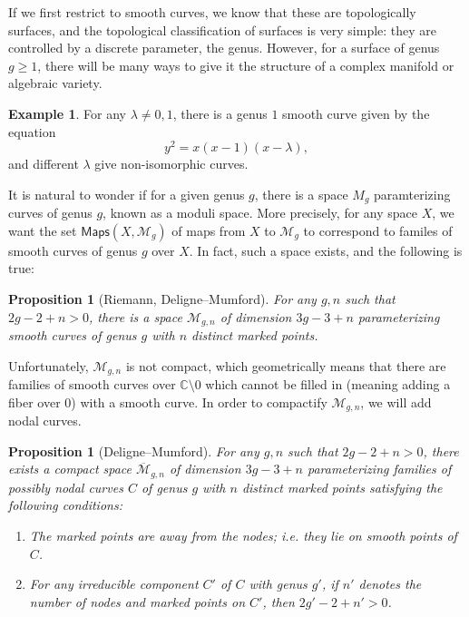 \documentclass{amsart}
\newtheorem{prop}[thm]{Proposition}
\theoremstyle{definition}
\newtheorem{exm}[thm]{Example}
\theoremstyle{remark}
\theoremstyle{plain}
\theoremstyle{definition}
\theoremstyle{remark}
\newcommand{\C}{\mathbb{C}}
\newcommand{\Mbar}{\overline{\mathcal{M}}}
\newcommand{\mc}[1]{\mathcal{#1}}
\newcommand{\ms}[1]{\mathsf{#1}}
\newcommand{\1}{\mathbf{1}}
\newcommand{\2}{\mathbf{2}}
\newcommand{\3}{\mathbf{3}}
\begin{document}
If we first restrict to smooth curves, we know that these are topologically surfaces, and the topological classification of surfaces is very simple: they are controlled by a discrete parameter, the genus. However, for a surface of genus $g \geq 1$, there will be many ways to give it the structure of a complex manifold or algebraic variety.

\begin{exm}
    For any $\lambda \neq 0,1$, there is a genus $1$ smooth curve given by the equation
    \[ y^2=x(x-1)(x-\lambda), \]
    and different $\lambda$ give non-isomorphic curves.
\end{exm}

It is natural to wonder if for a given genus $g$, there is a space $M_g$ paramterizing curves of genus $g$, known as a moduli space. More precisely, for any space $X$, we want the set $\ms{Maps}(X, \mc{M}_g)$ of maps from $X$ to $\mc{M}_g$ to correspond to familes of smooth curves of genus $g$ over $X$. In fact, such a space exists, and the following is true:

\begin{prop}[Riemann, Deligne--Mumford]
    For any $g, n$ such that $2g-2+n > 0$, there is a space $\mc{M}_{g,n}$ of dimension $3g-3+n$ parameterizing smooth curves of genus $g$ with $n$ distinct marked points.
\end{prop}

Unfortunately, $\mc{M}_{g,n}$ is not compact, which geometrically means that there are families of smooth curves over $\C \setminus 0$ which cannot be filled in (meaning adding a fiber over $0$) with a smooth curve. In order to compactify $\mc{M}_{g,n}$, we will add nodal curves.

\begin{prop}[Deligne--Mumford]
    For any $g,n$ such that $2g-2+n > 0$, there exists a compact space $\Mbar_{g,n}$ of dimension $3g-3+n$ parameterizing families of possibly nodal curves $C$ of genus $g$ with $n$ distinct marked points satisfying the following conditions:
    \begin{enumerate}
        \item The marked points are away from the nodes; i.e. they lie on smooth points of $C$.
        \item For any irreducible component $C'$ of $C$ with genus $g'$, if $n'$ denotes the number of nodes and marked points on $C'$, then $2g' - 2 + n' > 0$.
    \end{enumerate}
\end{prop}
\end{document}

